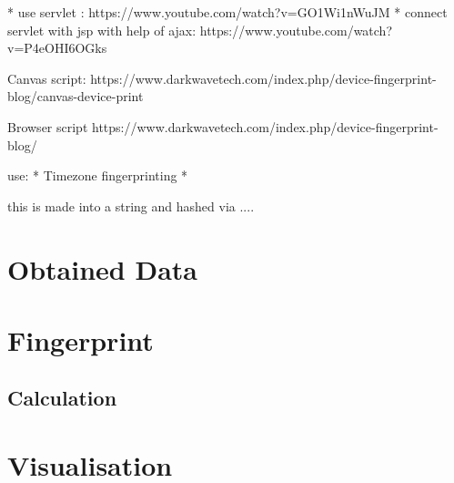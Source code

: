 * use servlet : https://www.youtube.com/watch?v=GO1Wi1nWuJM
* connect servlet with jsp with help of ajax: https://www.youtube.com/watch?v=P4eOHI6OGks

Canvas script:
https://www.darkwavetech.com/index.php/device-fingerprint-blog/canvas-device-print

Browser script
https://www.darkwavetech.com/index.php/device-fingerprint-blog/

use: 
* Timezone fingerprinting
*

this is made into a string and hashed via ....
 

\section{Obtained Data}


\section{Fingerprint}

\subsection{Calculation}

\section{Visualisation}